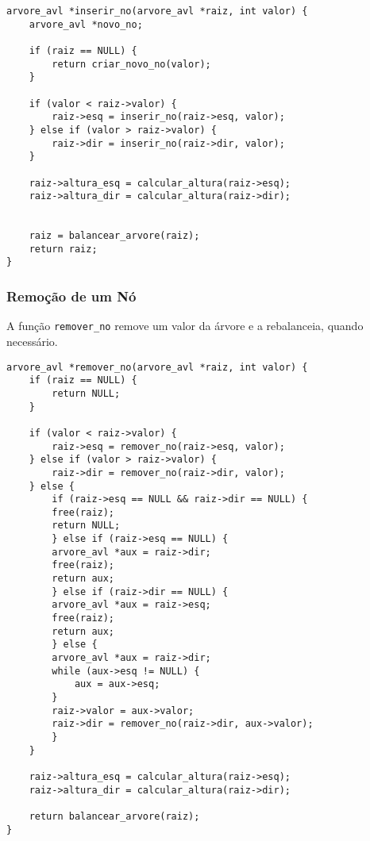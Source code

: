 \begin{lstlisting}
arvore_avl *inserir_no(arvore_avl *raiz, int valor) {
    arvore_avl *novo_no;
      
    if (raiz == NULL) {
        return criar_novo_no(valor);
    }
      
    if (valor < raiz->valor) {
        raiz->esq = inserir_no(raiz->esq, valor); 
    } else if (valor > raiz->valor) {
        raiz->dir = inserir_no(raiz->dir, valor); 
    }
      
    raiz->altura_esq = calcular_altura(raiz->esq);
    raiz->altura_dir = calcular_altura(raiz->dir);
      
      
    raiz = balancear_arvore(raiz);
    return raiz;
}
\end{lstlisting}

\vspace{3mm}

\subsubsection{Remoção de um Nó}

\vspace{3mm}

A função \texttt{remover\_no} remove um valor da árvore e a rebalanceia, quando necessário.

\begin{lstlisting}
arvore_avl *remover_no(arvore_avl *raiz, int valor) {
    if (raiz == NULL) {
        return NULL;
    }
      
    if (valor < raiz->valor) {
        raiz->esq = remover_no(raiz->esq, valor);
    } else if (valor > raiz->valor) {
        raiz->dir = remover_no(raiz->dir, valor);
    } else {
        if (raiz->esq == NULL && raiz->dir == NULL) {
        free(raiz);
        return NULL;
        } else if (raiz->esq == NULL) {
        arvore_avl *aux = raiz->dir;
        free(raiz);
        return aux;
        } else if (raiz->dir == NULL) {
        arvore_avl *aux = raiz->esq;
        free(raiz);
        return aux;
        } else {
        arvore_avl *aux = raiz->dir;
        while (aux->esq != NULL) {
            aux = aux->esq;
        }
        raiz->valor = aux->valor;
        raiz->dir = remover_no(raiz->dir, aux->valor);
        }
    }
      
    raiz->altura_esq = calcular_altura(raiz->esq);
    raiz->altura_dir = calcular_altura(raiz->dir);
  
    return balancear_arvore(raiz);
}
\end{lstlisting}

